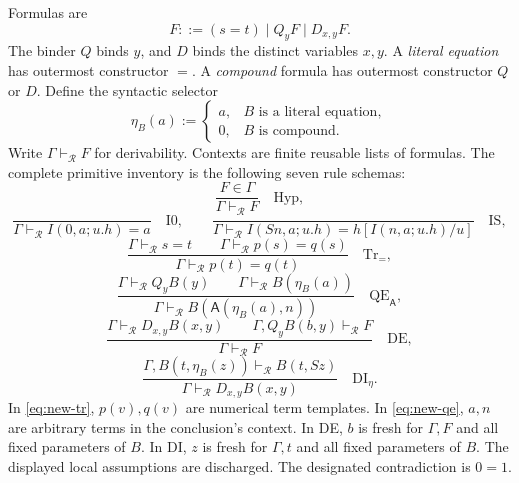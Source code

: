 Formulas are
\begin{equation}
 F ::= (s=t)\mid Q_yF\mid D_{x,y}F.
 \label{eq:new-formulas}
\end{equation}
The binder $Q$ binds $y$, and $D$ binds the distinct variables $x,y$.
A \emph{literal equation} has outermost constructor $=$.  A \emph{compound}
formula has outermost constructor $Q$ or $D$.  Define the syntactic selector
\begin{equation}
 \eta_B(a):=
 \begin{cases}
 a,&B\text{ is a literal equation},\\
 0,&B\text{ is compound}.
 \end{cases}
 \label{eq:new-eta}
\end{equation}
Write $\Gamma\vdash_{\mathcal R}F$ for derivability.  Contexts are finite
reusable lists of formulas.  The complete primitive inventory is the following
seven rule schemas:
\[
 \frac{F\in\Gamma}{\Gamma\vdash_{\mathcal R}F}
 \quad\mathrm{Hyp},
\]
\[
 \frac{}{\Gamma\vdash_{\mathcal R}I(0,a;u.h)=a}
 \quad\mathrm{I0},\qquad
 \frac{}{\Gamma\vdash_{\mathcal R}
 I(Sn,a;u.h)=h[I(n,a;u.h)/u]}
 \quad\mathrm{IS},
\]
\begin{equation}
 \frac{\Gamma\vdash_{\mathcal R}s=t\qquad
       \Gamma\vdash_{\mathcal R}p(s)=q(s)}
      {\Gamma\vdash_{\mathcal R}p(t)=q(t)}
 \quad\mathrm{Tr}_{=},
 \label{eq:new-tr}
\end{equation}
\begin{equation}
 \frac{\Gamma\vdash_{\mathcal R}Q_yB(y)\qquad
       \Gamma\vdash_{\mathcal R}B(\eta_B(a))}
      {\Gamma\vdash_{\mathcal R}
         B(\mathsf A(\eta_B(a),n))}
 \quad\mathrm{QE}_{\mathsf A},
 \label{eq:new-qe}
\end{equation}
\begin{equation}
 \frac{\Gamma\vdash_{\mathcal R}D_{x,y}B(x,y)\qquad
       \Gamma,Q_yB(b,y)\vdash_{\mathcal R}F}
      {\Gamma\vdash_{\mathcal R}F}
 \quad\mathrm{DE},
 \label{eq:new-de}
\end{equation}
\begin{equation}
 \frac{\Gamma,B(t,\eta_B(z))\vdash_{\mathcal R}B(t,Sz)}
      {\Gamma\vdash_{\mathcal R}D_{x,y}B(x,y)}
 \quad\mathrm{DI}_{\eta}.
 \label{eq:new-di}
\end{equation}
In \eqref{eq:new-tr}, $p(v),q(v)$ are numerical term templates.  In
\eqref{eq:new-qe}, $a,n$ are arbitrary terms in the conclusion's context.
In DE, $b$ is fresh for $\Gamma,F$ and all fixed parameters of $B$.
In DI, $z$ is fresh for $\Gamma,t$ and all fixed parameters of $B$.
The displayed local assumptions are discharged.  The designated
contradiction is $0=1$.

